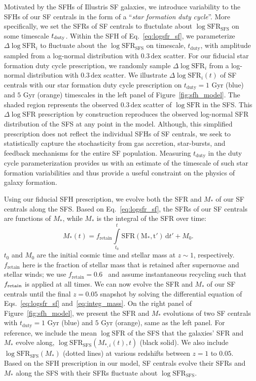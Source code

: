 \documentclass[12pt, letterpaper, preprint, tighten]{aastex62}
\newcommand{\edt}[1]{{\color{dred}{\bf} #1}}
\newcommand{\beq}{\begin{equation}}
\newcommand{\eeq}{\end{equation}}
\newcommand{\logsfr}{\log\mathrm{SFR}}
\newcommand{\logsfrsfs}{\log\mathrm{SFR}_\mathrm{SFS}}
\begin{document}
Motivated by the SFHs of Illustris SF galaxies, we introduce variability
to the SFHs of our SF centrals in the form of a ``\emph{star formation duty cycle}''. 
\edt{More specifically, we set the SFRs of SF centrals to fluctulate about 
$\logsfrsfs$ on some timescale $t_{\rm duty}$.}
Within the SFH of Eq.~\ref{eq:logsfr_sf}, we parameterize $\Delta \logsfr_i$ to
fluctuate about the $\logsfrsfs$ on timescale, $t_\mathrm{duty}$, with
amplitude sampled from a log-normal distribution with $0.3\,\mathrm{dex}$
scatter. For our fiducial star formation duty cycle prescription, we randomly
sample $\Delta \logsfr_i$ from a log-normal distribution with $0.3\,\mathrm{dex}$ scatter.
We illustrate $\Delta \logsfr_i(t)$ of SF centrals with our star formation
duty cycle prescription on $t_\mathrm{duty}=1$ Gyr (blue) and $5$ Gyr (orange)
timescales in the left panel of Figure~\ref{fig:sfh_model}.
The shaded region represents the observed $0.3\,\mathrm{dex}$ scatter of
$\logsfr$ in the SFS. This $\Delta \logsfr$ prescription by construction
reproduces the observed log-normal SFR distribution of the SFS at any point in 
the model. Although, this simplified prescription does not reflect the individual 
SFHs of SF centrals, we seek to statistically capture the stochasticity from 
gas accretion, star-bursts, and feedback mechanisms for the entire SF population.
Measuring $t_\mathrm{duty}$ in the duty cycle parameterization provides us with 
an estimate of the timescale of such star formation variabilities and thus provide 
a useful constraint on the physics of galaxy formation.

Using our fiducial SFH prescription, we evolve both the SFR and $M_*$
of our SF centrals along the SFS. Based on Eq.~\ref{eq:logsfr_sf},
the SFRs of our SF centrals are functions of $M_*$, while $M_*$
is the integral of the SFR over time:
\beq \label{eq:integ_mass}
M_*(t) = f_\mathrm{retain} \int\limits_{t_0}^{t} \mathrm{SFR(M_*, t')}\,\mathrm{d}t' + M_0.
\eeq
$t_0$ and $M_0$ are the initial cosmic time and stellar mass at $z \sim 1$,
respectively. $f_\mathrm{retain}$ here is the fraction of stellar mass
that is retained after supernovae and stellar winds; we use
$f_\mathrm{retain} = 0.6$~\citep{wetzel2013} 
\edt{and assume instantaneous recycling such that $f_{\rm retain}$ is applied at all times.}
We can now evolve the SFR and
$M_*$ of our SF centrals until the final $z=0.05$ snapshot by
solving the differential equation of Eqs.~\ref{eq:logsfr_sf} and~\ref{eq:integ_mass}.
On the right panel of Figure~\ref{fig:sfh_model}, we present the
$\mathrm{SFR}$ and $M_*$ evolutions of two SF centrals with
$t_\mathrm{duty}=1$ Gyr (blue) and $5$ Gyr (orange), same
as the left panel. For reference, we include the mean $\logsfr$ of the SFS
that the galaxies' SFR and $M_*$ evolve along, $\logsfrsfs(M_{*,i}(t), t)$
(black solid). We also include $\logsfrsfs(M_*)$ (dotted lines) at various
redshifts between $z = 1$ to $0.05$. Based on the SFH prescription in our
model, SF centrals evolve their SFRs and $M_*$ along the SFS
with their SFRs fluctuate about $\logsfrsfs$.
\end{document}
